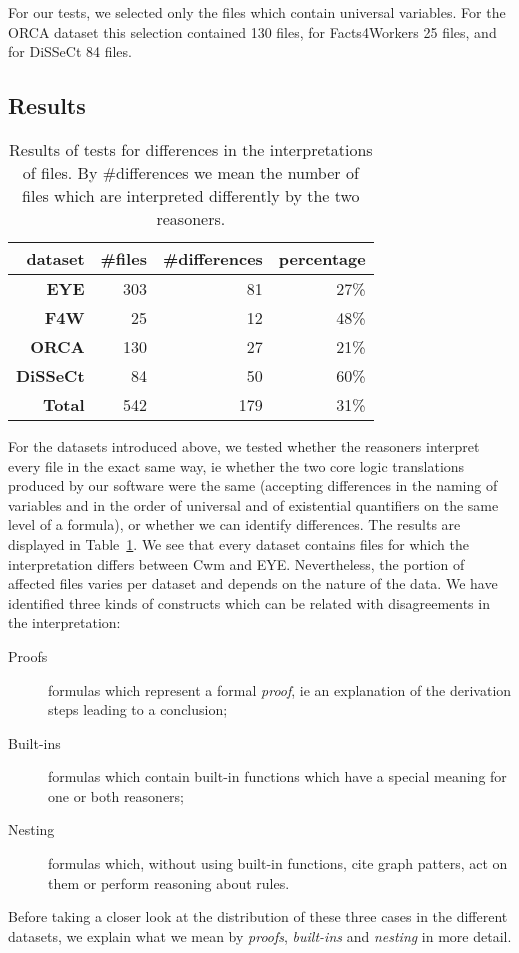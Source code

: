 For our tests, we selected only the files which contain universal variables. For the ORCA dataset this selection contained 130 files, for Facts4Workers 25 files,
and for DiSSeCt 84 files.


\subsection{Results}\label{results}
\begin{table}
\begin{center}
\begin{tabular}{rrrr}
\hline
\bf dataset& \bf \#files & \bf \#differences & \bf percentage\\
\hline
 \bf EYE &303 & 81 &  27\%\\
 \bf F4W &25 & 12 &  48\% \\
 \bf ORCA & 130& 27 & 21\%\\
 \bf DiSSeCt & 84&50&  60\%\\
 \hline
 \bf Total & 542 & 179& 31\%\\
 \hline
\end{tabular}
\end{center}
\caption{Results of tests for differences in the interpretations of \nthree files. By \#differences we mean the number of files which are interpreted differently 
by the two reasoners.\label{result}}
\end{table}
For the datasets introduced above, we  tested whether the reasoners interpret every file in the exact same way, ie whether the two 
core logic translations produced by our 
software were the same (accepting differences in the naming of variables and in the order of universal and of existential quantifiers on the same 
level of a formula), 
or whether we can identify differences. The results 
are displayed 
in Table~\ref{result}. We see that every dataset contains files for which the interpretation differs between Cwm and EYE. Nevertheless, 
the portion of affected files varies per dataset and depends on the nature of the data. We have identified three kinds of constructs which can be related with disagreements 
in the interpretation:
\begin{description}
  \item[Proofs] formulas which represent a formal \emph{proof}, ie an explanation of the derivation steps leading to a conclusion; %
  \item[Built-ins] formulas which contain built-in functions which have a special meaning for one or both reasoners;
  \item[Nesting] formulas which, without using built-in functions, cite graph patters, act on them or perform
reasoning about rules.
\end{description}
Before taking a closer look at the distribution of these three cases in the different datasets, 
we explain what we mean by \emph{proofs}, \emph{built-ins} and \emph{nesting} in more detail.

